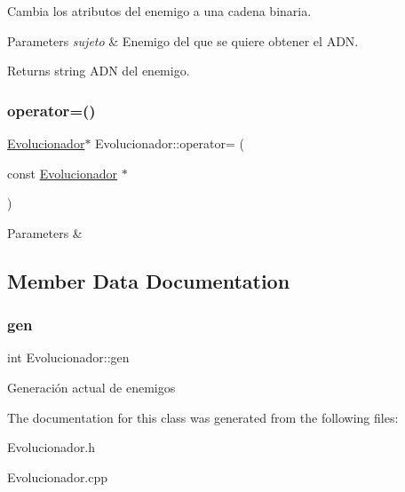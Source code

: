 Cambia los atributos del enemigo a una cadena binaria. 


\begin{DoxyParams}{Parameters}
{\em sujeto} & Enemigo del que se quiere obtener el A\+DN. \\
\hline
\end{DoxyParams}
\begin{DoxyReturn}{Returns}
string A\+DN del enemigo. 
\end{DoxyReturn}
\mbox{\label{classEvolucionador_a18638af1410d418b569a95764c0ad4ec}} 
\subsubsection{\texorpdfstring{operator=()}{operator=()}}
{\footnotesize\ttfamily \hyperlink{classEvolucionador}{Evolucionador}$\ast$ Evolucionador\+::operator= (\begin{DoxyParamCaption}\item[{const \hyperlink{classEvolucionador}{Evolucionador} $\ast$}]{ }\end{DoxyParamCaption})\hspace{0.3cm}{\ttfamily [delete]}}


\begin{DoxyParams}{Parameters}
{\em } & \\
\hline
\end{DoxyParams}


\subsection{Member Data Documentation}
\mbox{\label{classEvolucionador_ad998d4fe28318e749f2e11f0b5000141}} 
\subsubsection{\texorpdfstring{gen}{gen}}
{\footnotesize\ttfamily int Evolucionador\+::gen}

Generación actual de enemigos 

The documentation for this class was generated from the following files\+:\begin{DoxyCompactItemize}
\item 
Evolucionador.\+h\item 
Evolucionador.\+cpp\end{DoxyCompactItemize}
